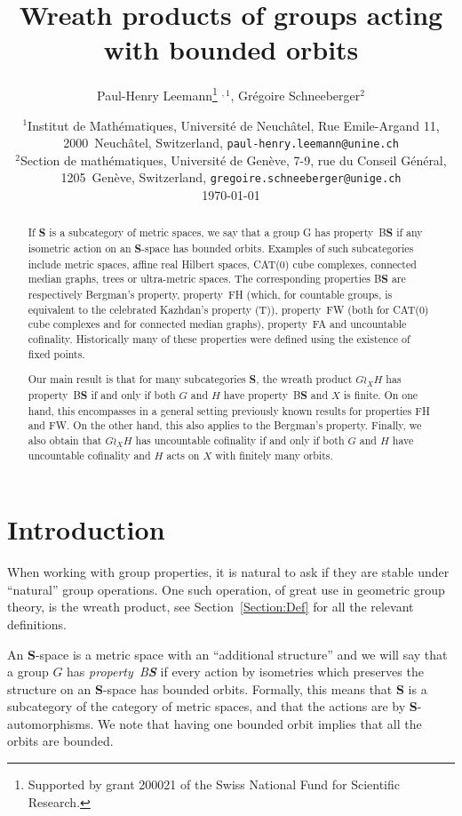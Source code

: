 \documentclass[a4paper]{article}
\title{Wreath products of groups acting with bounded orbits}
\author{Paul-Henry Leemann\thanks{Supported by grant 200021\textunderscore188578 of the Swiss National Fund for Scientific Research.} $^{,1}$, Grégoire Schneeberger$^2$}
\date{%
{\small $^1$Institut de Math\'ematiques, Universit\'e de Neuch\^atel, Rue Emile-Argand 11, 2000~Neuch\^atel, Switzerland, \texttt{paul-henry.leemann@unine.ch}}\\%
{\small $^2$Section de math\'ematiques, Universit\'e de Gen\`eve, 7-9, rue du Conseil G\'en\'eral, 1205~Gen\`eve, Switzerland, \texttt{gregoire.schneeberger@unige.ch}}\\[2ex]%
\today}
\theoremstyle{definition}
\newcommand*{\category}[1]{\textbf{#1}}
\newcommand*{\CatS}{\category{S}}
\newcommand*{\BS}{B\textbf{S}}
\newcommand*{\FH}{FH}
\newcommand*{\FW}{FW}
\newcommand*{\FA}{FA}
\begin{document}
\maketitle
%
%
%
%
%
%
%
%
%
%
\begin{abstract}
If \CatS{} is a subcategory of metric spaces, we say that a group G has property~\BS{} if any isometric action on an \CatS-space has bounded orbits.
Examples of such subcategories include metric spaces, affine real Hilbert spaces, CAT(0) cube complexes, connected median graphs, trees or ultra-metric spaces.
The corresponding properties \BS{} are respectively Bergman's property, property~\FH{}  (which, for countable groups, is equivalent to the celebrated Kazhdan's property (T)), property~\FW{} (both for CAT(0) cube complexes and for connected median graphs), property~\FA{} and uncountable cofinality.
Historically many of these properties were defined using the existence of fixed points.

Our main result is that for many subcategories \CatS, the wreath product $G\wr_XH$ has property~\BS{} if and only if both $G$ and $H$ have property~\BS{} and $X$ is finite.
On one hand, this encompasses in a general setting previously known results for properties \FH{} and \FW.
On the other hand, this also applies to the Bergman's property.
Finally, we also obtain that $G\wr_XH$ has uncountable cofinality if and only if both $G$ and $H$ have uncountable cofinality and $H$ acts on $X$ with finitely many orbits.
\end{abstract}
%
%
%
%
%
%
%
%
%
%
%
%
%
%
%
%
%
%
%
%
%
%
%
%
%
\section{Introduction}\label{Section:Intro}
%
%
%
%
%
%
When working with group properties, it is natural to ask if they are stable under ``natural'' group operations.
One such operation, of great use in geometric group theory, is the wreath product, see Section~\ref{Section:Def} for all the relevant definitions.

An \CatS-space is a metric space with an ``additional structure'' and we will say that a group $G$ has \emph{property~\BS} if every action by isometries which preserves the structure on an \CatS-space has bounded orbits.
Formally, this means that \CatS{} is a subcategory of the category of metric spaces, and that the actions are by \CatS-automorphisms.
We note that having one bounded orbit implies that all the orbits are bounded.
\end{document}
